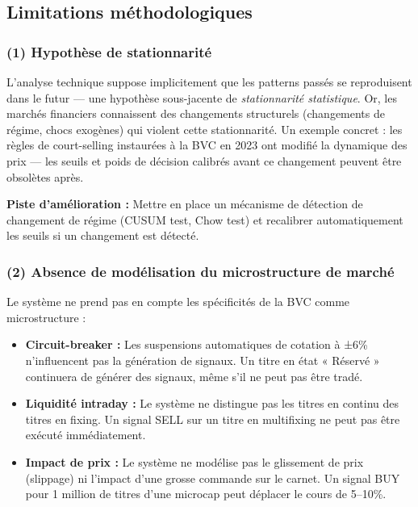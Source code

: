 \documentclass{rapportENSIAS} %
\begin{document}
\subsection{Limitations méthodologiques}

\noindent
\subsubsection*{(1) Hypothèse de stationnarité}

\noindent
L'analyse technique suppose implicitement que les patterns passés se reproduisent dans le futur — une hypothèse sous-jacente de \textit{stationnarité statistique}. Or, les marchés financiers connaissent des changements structurels (changements de régime, chocs exogènes) qui violent cette stationnarité. Un exemple concret : les règles de court-selling instaurées à la BVC en 2023 ont modifié la dynamique des prix — les seuils et poids de décision calibrés avant ce changement peuvent être obsolètes après.

\vspace{0.2cm}
\noindent
\textbf{Piste d'amélioration :} Mettre en place un mécanisme de détection de changement de régime (CUSUM test, Chow test) et recalibrer automatiquement les seuils si un changement est détecté.

\subsubsection*{(2) Absence de modélisation du microstructure de marché}

\noindent
Le système ne prend pas en compte les spécificités de la BVC comme microstructure :
\begin{itemize}
    \item \textbf{Circuit-breaker :} Les suspensions automatiques de cotation à ±6\% n'influencent pas la génération de signaux. Un titre en état « Réservé » continuera de générer des signaux, même s'il ne peut pas être tradé.
    \item \textbf{Liquidité intraday :} Le système ne distingue pas les titres en continu des titres en fixing. Un signal SELL sur un titre en multifixing ne peut pas être exécuté immédiatement.
    \item \textbf{Impact de prix :} Le système ne modélise pas le glissement de prix (slippage) ni l'impact d'une grosse commande sur le carnet. Un signal BUY pour 1 million de titres d'une microcap peut déplacer le cours de 5–10\%.
\end{itemize}
\end{document}
